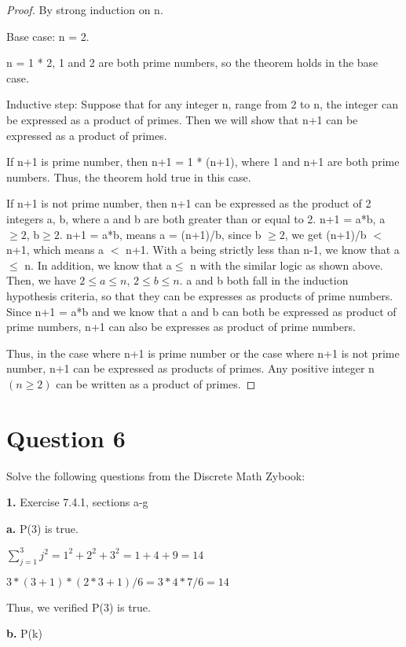 \documentclass[11pt]{article}
\begin{document}
	\begin{proof}
	By strong induction on n.
	
	Base case: n = 2.
	
	n = 1 * 2, 1 and 2 are both prime numbers, so the theorem holds in the base case.
	
	Inductive step: Suppose that for any integer n, range from 2 to n, the integer can be expressed as a product of primes. Then we will show that n+1 can be expressed as a product of primes. 
	
	If n+1 is prime number, then n+1 = 1 * (n+1), where 1 and n+1 are both prime numbers. Thus, the theorem hold true in this case.
	
	If n+1 is not prime number, then n+1 can be expressed as the product of 2 integers a, b, where a and b are both greater than or equal to 2. n+1 = a*b, a$\geq 2$, b$\geq 2$. n+1 = a*b, means a = (n+1)/b, since b $\geq 2$, we get (n+1)/b $<$ n+1, which means a $<$ n+1. With a being strictly less than n-1, we know that a$\leq$ n. In addition, we know that a$\leq$ n with the similar logic as shown above. Then, we have $2\leq a\leq n$, $2\leq b\leq n$. a and b both fall in the induction hypothesis criteria, so that they can be expresses as products of prime numbers. Since n+1 = a*b and we know that a and b can both be expressed as product of prime numbers, n+1 can also be expresses as product of prime numbers. 
	
	Thus, in the case where n+1 is prime number or the case where n+1 is not prime number, n+1 can be expressed as products of primes. Any positive integer n $(n\geq 2)$ can be written as a product of primes.
	
	\end{proof}
	
	\newpage
	\section*{Question 6}
	
	Solve the following questions from the Discrete Math Zybook:
	
	\textbf{1. }Exercise 7.4.1, sections a-g
	
	\textbf{a.}
	P(3) is true.
	
	$\sum_{j=1}^{3} j^2=1^2+2^2+3^2=1+4+9=14$
	
	$3*(3+1)*(2*3+1)/6=3*4*7/6=14$
	
	Thus, we verified P(3) is true.
	
	\textbf{b.}
	P(k)
	
\end{document}
